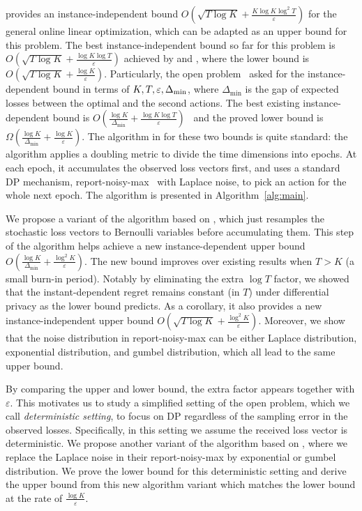 \citet{jain2014near} provides an instance-independent bound $O\left( \sqrt{T\log K}  + \frac{K\log K\log^2 T}{\varepsilon}\right)$ for the general online linear optimization, which can be adapted as an upper bound for this problem.
The best instance-independent bound so far for this problem is $O\left(\sqrt{T\log K} + \frac{\log K \log T}{\varepsilon}\right)$ achieved by \citet{asi2023private} and \citet{hu2021near}, where the lower bound is $O\left(\sqrt{T\log K}+\frac{\log K}{\varepsilon}\right)$.
Particularly, the open problem~\citep{hu2024open} asked for the instance-dependent bound in terms of $K, T, \varepsilon, \Delta_{\rm min}$, where $\Delta_{\min}$ is the gap of expected losses between the optimal and the second actions. 
The best existing instance-dependent bound is $O\left(\frac{\log K}{\Delta_{\min}} + \frac{\log K \log T}{\varepsilon}\right)$~\citep{hu2021near} and the proved lower bound is $\Omega\left(\frac{\log K}{\Delta_{\min}} + \frac{\log K}{\varepsilon}\right)$.
The algorithm in \citet{hu2021near} for these two bounds is quite standard: the algorithm applies a doubling metric to divide the time dimensions into epochs. 
At each epoch, it accumulates the observed loss vectors first, and uses a standard DP mechanism, report-noisy-max~\citep{dwork2014algorithmic} with Laplace noise, to pick an action for the whole next epoch.
The algorithm is presented in Algorithm~\ref{alg:main}.

We propose a variant of the algorithm based on \citet{hu2021near}, which just resamples the stochastic loss vectors to Bernoulli variables before accumulating them.
This step of the algorithm helps achieve a new instance-dependent upper bound $O\left(\frac{\log K}{\Delta_{\min}} + \frac{\log^2 K}{\varepsilon}\right)$.
The new bound improves over existing results when $T>K$ (a small burn-in period). Notably by eliminating the extra $\log T$ factor, we showed that the instant-dependent regret remains constant (in $T$) under differential privacy as the lower bound predicts.
As a corollary, it also provides a new instance-independent upper bound $O\left(\sqrt{T\log K} + \frac{\log^2 K}{\varepsilon}\right)$.
Moreover, we show that the noise distribution in report-noisy-max can be either Laplace distribution, exponential distribution, and gumbel distribution, which all lead to the same upper bound.

By comparing the upper and lower bound, the extra factor appears together with $\varepsilon$.
This motivates us to study a simplified setting of the open problem, which we call \textit{deterministic setting}, to focus on DP regardless of the sampling error in the observed losses.
Specifically, in this setting we assume the received loss vector is deterministic.
We propose another variant of the algorithm based on \citet{hu2021near}, where we replace the Laplace noise in their report-noisy-max by exponential or gumbel distribution.
We prove the lower bound for this deterministic setting and derive the upper bound from this new algorithm variant which matches the lower bound at the rate of $\frac{\log K}{\varepsilon}$.

